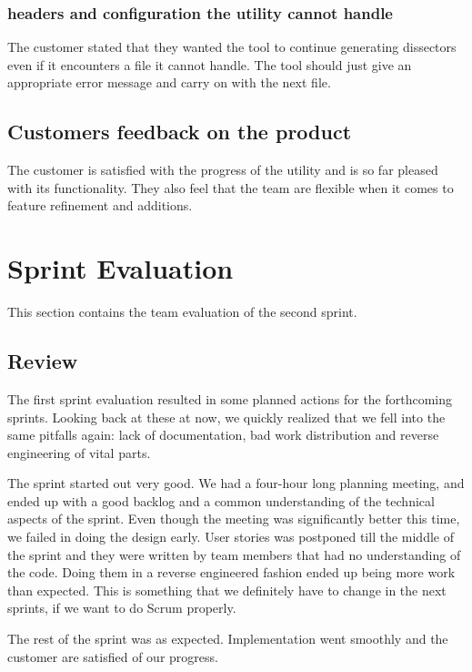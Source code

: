 \subsubsection{\Glspl{header} and configuration the \gls{utility} cannot handle}
The customer stated that they wanted the tool to continue generating \glspl{dissector} even if it encounters a file it cannot handle. The tool should just give an appropriate error message and carry on with the next file.

\subsection{Customers feedback on the product}
The customer is satisfied with the progress of the \gls{utility} and is so far pleased with its functionality. They also feel that the team are flexible when it comes to feature refinement and additions. 

\section{Sprint Evaluation}
This section contains the team evaluation of the second sprint.

\subsection{Review}
The first sprint evaluation resulted in some planned actions for the forthcoming sprints. Looking back at these at now, we quickly realized that we fell into the same pitfalls again: lack of documentation, bad work distribution and reverse engineering of vital parts.

The sprint started out very good. We had a four-hour long planning meeting, and ended up with a good backlog and a common understanding of the technical aspects of the sprint. Even though the meeting was significantly better this time, we failed in doing the design early. User stories was postponed till the middle of the sprint and they were written by team members that had no understanding of the code. Doing them in a reverse engineered fashion ended up being more work than expected. This is something that we definitely have to change in the next sprints, if we want to do Scrum properly.

The rest of the sprint was as expected. Implementation went smoothly and the customer are satisfied of our progress.

